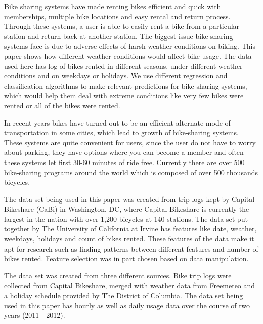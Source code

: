 \documentclass[12pt]{article}
\date{}
\author{\theauthor}
\newcommand{\ci}[1]{\cite{#1}}
\begin{document}
\maketitle
\thispagestyle{empty}
\newpage
\tableofcontents
\newpage


Bike sharing systems have made renting bikes efficient and quick with
memberships, multiple bike locations and easy rental and return
process. Through these systems, a user is able to easily rent a bike from a
particular station and return back at another station. The biggest issue bike
sharing systems face is due to adverse effects of harsh weather conditions on
biking. This paper shows how different weather conditions would affect bike
usage. The data used here has log of bikes rented in different seasons, under
different weather conditions and on weekdays or holidays. We use different
regression and classification algorithms to make relevant predictions for bike
sharing systems, which would help them deal with extreme conditions like very
few bikes were rented or all of the bikes were rented.



In recent years bikes have turned out to be an efficient alternate mode of
transportation in some cities, which lead to growth of bike-sharing
systems. These systems are quite convenient for users, since the user do not
have to worry about parking, they have options where you can become a member
and often these systems let first 30-60 minutes of ride free. Currently there
are over 500 bike-sharing programs around the world which is composed of over
500 thousands bicycles\ci{ucibikeshare}.

The data set being used in this paper was created from trip logs kept by
Capital Bikeshare (CaBi) in Washington, DC, where Capital Bikeshare is
currently the largest in the nation with over 1,200 bicycles at 140
stations. The data set put together by The University of California at Irvine
has features like date, weather, weekdays, holidays and count of bikes
rented. These features of the data make it apt for research such as finding
patterns between different features and number of bikes rented.  Feature
selection was in part chosen based on data manipulation\ci{gebhart2013impact}.

The data set was created from three different sources. Bike trip logs were
collected from Capital Bikeshare, merged with weather data from Freemeteo and a
holiday schedule provided by The District of Columbia. The data set being used
in this paper has hourly as well as daily usage data over the course of two
years (2011 - 2012).
\end{document}

